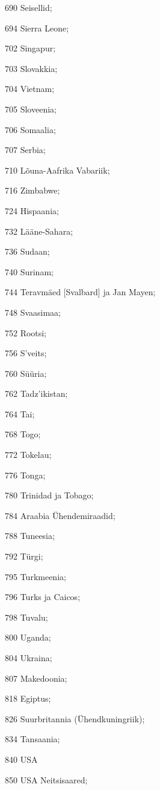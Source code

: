 \documentclass[a4paper]{article}
\begin{document}
\begin{description}
\begin{inparaitem}
    \item[690] Seisellid;
    \item[694] Sierra Leone;
    \item[702] Singapur;
    \item[703] Slovakkia;
    \item[704] Vietnam;
    \item[705] Sloveenia;
    \item[706] Somaalia;
    \item[707] Serbia;
    \item[710] Lõuna-Aafrika Vabariik;
    \item[716] Zimbabwe;
    \item[724] Hispaania;
    \item[732] Lääne-Sahara;
    \item[736] Sudaan;
    \item[740] Surinam;
    \item[744] Teravmäed [Svalbard] ja Jan Mayen;
    \item[748] Svaasimaa;
    \item[752] Rootsi;
    \item[756] S'veits;
    \item[760] Süüria;
    \item[762] Tadz'ikistan;
    \item[764] Tai;
    \item[768] Togo;
    \item[772] Tokelau;
    \item[776] Tonga;
    \item[780] Trinidad ja Tobago;
    \item[784] Araabia Ühendemiraadid;
    \item[788] Tuneesia;
    \item[792] Türgi;
    \item[795] Turkmeenia;
    \item[796] Turks ja Caicos;
    \item[798] Tuvalu;
    \item[800] Uganda;
    \item[804] Ukraina;
    \item[807] Makedoonia;
    \item[818] Egiptus;
    \item[826] Suurbritannia (Ühendkuningriik);
    \item[834] Tansaania;
    \item[840] USA
    \item[850] USA Neitsisaared;

\end{inparaitem}
\end{description}
\end{document}

